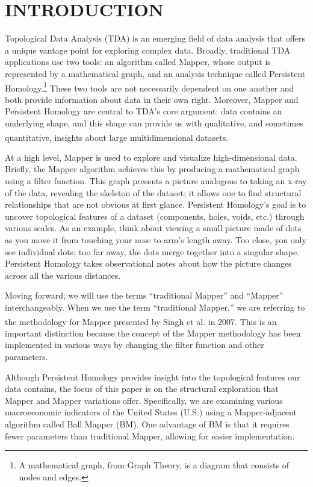 \documentclass[
  10pt,
  letterpaper,
  DIV=11,
  numbers=noendperiod]{scrartcl}
\begin{document}
\section{INTRODUCTION}\label{introduction}

Topological Data Analysis (TDA) is an emerging field of data analysis
that offers a unique vantage point for exploring complex data. Broadly,
traditional TDA applications use two tools: an algorithm called Mapper,
whose output is represented by a mathematical graph, and an analysis
technique called Persistent
Homology.\textsuperscript{}\footnote{A mathematical graph, from Graph Theory, is a diagram that consists of nodes and edges.}
These two tools are not necessarily dependent on one another and both
provide information about data in their own right. Moreover, Mapper and
Persistent Homology are central to TDA's core argument: data contains an
underlying shape, and this shape can provide us with qualitative, and
sometimes quantitative, insights about large multidimensional
datasets.\textsuperscript{}

At a high level, Mapper is used to explore and visualize
high-dimensional data. Briefly, the Mapper algorithm achieves this by
producing a mathematical graph using a filter function. This graph
presents a picture analogous to taking an x-ray of the data, revealing
the skeleton of the dataset; it allows one to find structural
relationships that are not obvious at first glance. Persistent
Homology's goal is to uncover topological features of a dataset
(components, holes, voids, etc.) through various scales. As an example,
think about viewing a small picture made of dots as you move it from
touching your nose to arm's length away. Too close, you only see
individual dots; too far away, the dots merge together into a singular
shape. Persistent Homology takes observational notes about how the
picture changes across all the various distances.

Moving forward, we will use the terms ``traditional Mapper'' and
``Mapper'' interchangeably. When we use the term ``traditional Mapper,''
we are referring to the methodology for Mapper presented by Singh et
al.\textsuperscript{} in
2007. This is an important distinction because the concept of the Mapper
methodology has been implemented in various ways by changing the filter
function and other parameters.

Although Persistent Homology provides insight into the topological
features our data contains, the focus of this paper is on the structural
exploration that Mapper and Mapper variations offer. Specifically, we
are examining various macroeconomic indicators of the United States
(U.S.) using a Mapper-adjacent algorithm called Ball Mapper (BM). One
advantage of BM is that it requires fewer parameters than traditional
Mapper, allowing for easier implementation.
\end{document}
